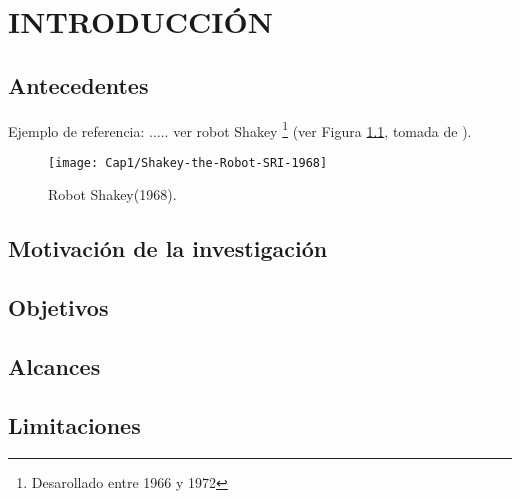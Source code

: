 \chapter{INTRODUCCIÓN}


\section{Antecedentes}

Ejemplo de referencia: ..... ver robot Shakey%
\footnote{Desarollado entre 1966 y 1972%
} (ver Figura \ref{Flo:shakey}, tomada de \cite{Greenia}).

%
\begin{figure}[H]
\begin{centering}
\texttt{[image: Cap1/Shakey-the-Robot-SRI-1968]}
\par\end{centering}

\caption{Robot Shakey(1968).}


\label{Flo:shakey}
\end{figure}

\section{Motivación de la investigación}


\section{Objetivos}


\section{Alcances}


\section{Limitaciones}
